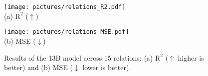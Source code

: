 \begin{figure*}[h]
\vskip 0.2in
\begin{center}
\begin{minipage}[b]{0.49\textwidth} %
    \centering
    \texttt{[image: pictures/relations\_R2.pdf]}\\
    (a) $\text{R}^2$ ($\uparrow$)
\end{minipage}
\hfill
\begin{minipage}[b]{0.49\textwidth} %
    \centering
    \texttt{[image: pictures/relations\_MSE.pdf]}\\
    (b) MSE ($\downarrow$)
\end{minipage}
\caption{Results of the 13B model across 15 relations: (a) $\text{R}^2$ ($\uparrow$ higher is better) and (b) MSE ($\downarrow$ lower is better).}
\label{15relations}
\end{center}
\end{figure*}
